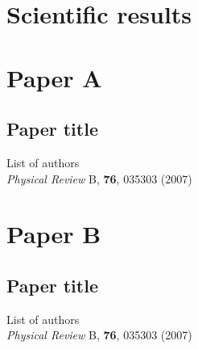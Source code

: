 \chapter{Scientific results}


\chapter*{Paper A}
\section{Paper title}

\noindent List of authors\\

\noindent \textit{Physical Review} B, \textbf{76}, 035303 (2007)
\cleardoublepage



\chapter*{Paper B}
\section{Paper title}

\noindent List of authors\\

\noindent \textit{Physical Review} B, \textbf{76}, 035303 (2007)
\cleardoublepage



